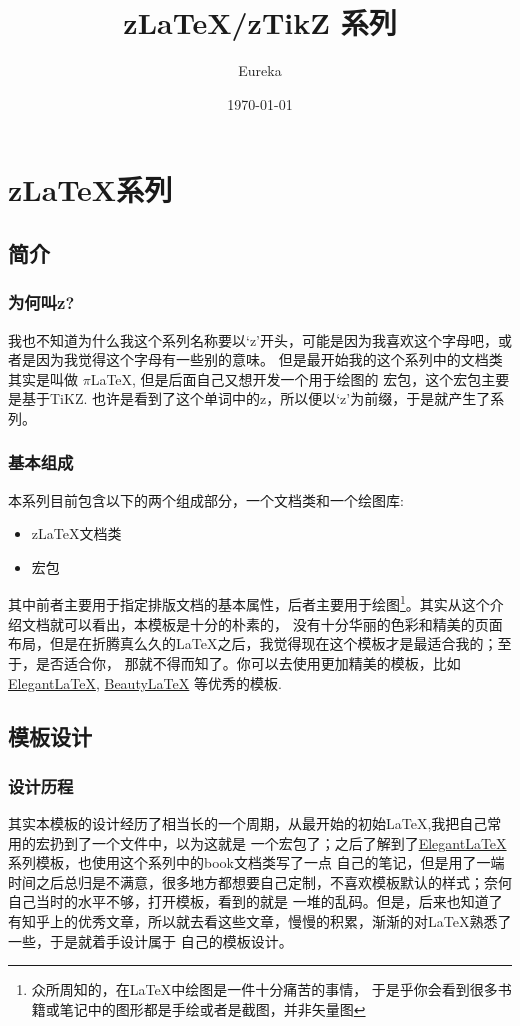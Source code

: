 \documentclass[
    lang=cn, 
    layout=oneside, 
    margin=false, 
    math-alias=true,
]{zlatex}
\title{z\LaTeX{}/zTikZ 系列}
\author{Eureka}
\date{\today}
\let\cmd\zlatexVerb
\newcommand{\Footnote}[1]{\stepcounter{footnote}\footnote[\thefootnote]{#1}}
\begin{document}
\maketitle
\frontmatter
\tableofcontents
\mainmatter



\chapter{z\LaTeX{}系列}
\section{简介}
\subsection{为何叫z?}
我也不知道为什么我这个系列名称要以`z'开头，可能是因为我喜欢这个字母吧，或者是因为我觉得这个字母有一些别的意味。
但是最开始我的这个系列中的文档类其实是叫做 $\pi$\LaTeX{}, 但是后面自己又想开发一个用于绘图的
宏包，这个宏包主要是基于TiKZ. 也许是看到了这个单词中的z，所以便以`z'为前缀，于是就产生了系列。

\subsection{基本组成}
本系列目前包含以下的两个组成部分，一个文档类和一个绘图库:
\begin{itemize}
    \item z\LaTeX{}文档类
    \item {}宏包
\end{itemize}

其中前者主要用于指定排版文档的基本属性，后者主要用于绘图\Footnote{众所周知的，在\LaTeX{}中绘图是一件十分痛苦的事情，
于是乎你会看到很多书籍或笔记中的图形都是手绘或者是截图，并非矢量图}。其实从这个介绍文档就可以看出，本模板是十分的朴素的，
没有十分华丽的色彩和精美的页面布局，但是在折腾真么久的\LaTeX{}之后，我觉得现在这个模板才是最适合我的；至于，是否适合你，
那就不得而知了。你可以去使用更加精美的模板，比如 \href{https://github.com/ElegantLaTeX}{Elegant\LaTeX{}}, 
\href{https://github.com/BeautyLaTeX/Beautybook}{Beauty\LaTeX{}} 等优秀的模板. 

\section{模板设计}
\subsection{设计历程}
其实本模板的设计经历了相当长的一个周期，从最开始的初始\LaTeX{},我把自己常用的宏扔到了一个\cmd{.sty}文件中，以为这就是
一个宏包了；之后了解到了\href{https://github.com/ElegantLaTeX}{Elegant\LaTeX{}}系列模板，也使用这个系列中的book文档类写了一点
自己的笔记，但是用了一端时间之后总归是不满意，很多地方都想要自己定制，不喜欢模板默认的样式；奈何自己当时的水平不够，打开模板，看到的就是
一堆的乱码。但是，后来也知道了有知乎上的优秀文章，所以就去看这些文章，慢慢的积累，渐渐的对\LaTeX{}熟悉了一些，于是就着手设计属于
自己的模板设计。
\end{document}
